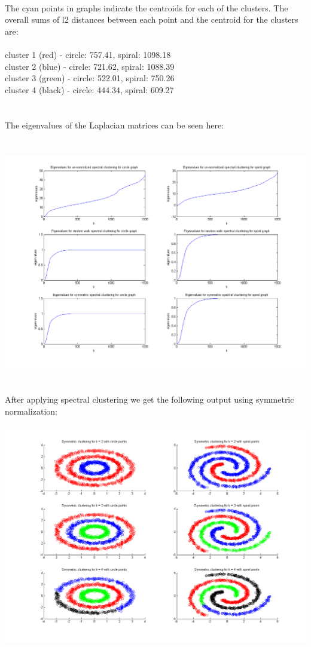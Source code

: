 \documentclass[paper=a4, fontsize=11pt]{scrartcl} %
\numberwithin{equation}{section} %
\numberwithin{figure}{section} %
\numberwithin{table}{section} %
\begin{document}
	\\\\\\
	The cyan points in graphs indicate the centroids for each of the clusters. The overall sums of l2 distances between each point and the centroid for the clusters are:
	\\\\
	cluster 1 (red) - circle: 757.41, spiral: 1098.18\\
	cluster 2 (blue) - circle: 721.62, spiral: 1088.39\\
	cluster 3 (green) - circle: 522.01, spiral: 750.26\\
	cluster 4 (black) - circle: 444.34, spiral: 609.27
	\\\\\\
	The eigenvalues of the Laplacian matrices can be seen here:
	\\\\\\
	\hspace*{-3cm}\includegraphics[scale=0.6]{eigenvalues}
	\\\\\\
	After applying spectral clustering we get the following output using symmetric normalization:
	\\\\
	\hspace*{-4cm}\includegraphics[scale=0.7]{symmetric_spectral_clustering}
\end{document}
